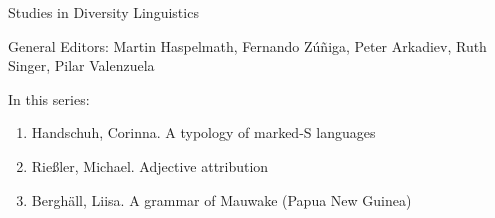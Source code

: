 
{\large Studies in Diversity Linguistics}

\bigskip

General Editors: Martin Haspelmath, Fernando Zúñiga, Peter Arkadiev, Ruth Singer, Pilar Valen­zuela

\bigskip

In this series:

\begin{enumerate}
\item Handschuh, Corinna. A typology of marked-S languages
\item Rießler, Michael. Adjective attribution
\item Berghäll, Liisa. A grammar of Mauwake (Papua New Guinea)
\end{enumerate}


